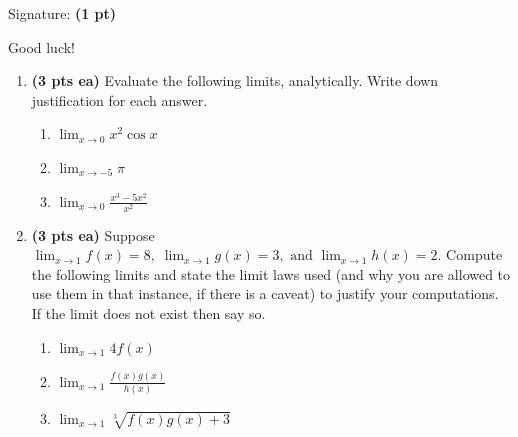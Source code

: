 \documentclass[12pt,letterpaper]{article}
\begin{document}
\vspace{2pc}
Signature: {\bf (1 pt)} \underline{\hspace{91ex}}

\begin{flushright}\Large Good luck!\end{flushright}

\begin{enumerate}
\newpage

\item {\bf (3 pts ea)} Evaluate the following limits, analytically.  Write down justification for each answer.

\vspace{1pc}
\begin{enumerate}
\item $\displaystyle\lim_{x\to 0}x^2\cos x$

\vspace{14pc}
\item $\displaystyle\lim_{x\to -5}\pi$

\vspace{14pc}
\item $\displaystyle\lim_{x\to 0}\frac{x^3-5x^2}{x^2}$
\end{enumerate}

\newpage
\item {\bf (3 pts ea)} Suppose 
$\displaystyle\lim_{x\to 1}f(x)=8,\;\displaystyle\lim_{x\to 1}g(x)=3,\text{ and }\displaystyle\lim_{x\to 1}h(x)=2.$  
Compute the following limits and state the limit laws used (and why you are allowed to use them in that instance, if there is a caveat) to justify your computations.  If the limit does not exist then say so.

\vspace{1pc}
\begin{enumerate}
\item $\displaystyle\lim_{x\to 1}4f(x)$

\vspace{13pc}
\item $\displaystyle\lim_{x\to 1}\frac{f(x)g(x)}{h(x)}$

\vspace{13pc}
\item $\displaystyle\lim_{x\to 1}\sqrt[3]{f(x)g(x)+3}$
\end{enumerate}


\end{enumerate}
\end{document}
